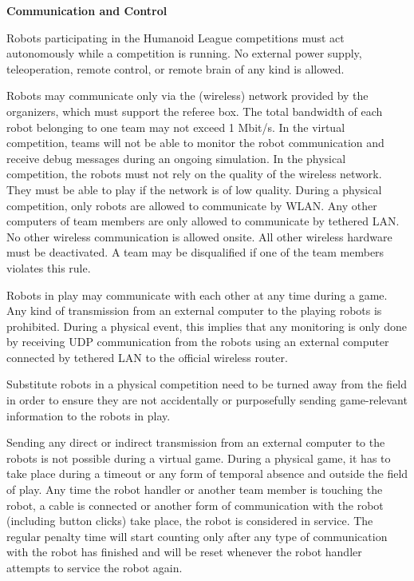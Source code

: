 {\bfseries Communication and Control}

\headlinebox

Robots participating in the Humanoid League competitions must act autonomously while a competition is running. No external power supply, teleoperation, remote control, or remote brain of any kind is allowed.

\bigskip

Robots may communicate only via the (wireless) network provided by the organizers, which must support the referee box. The total bandwidth of each robot belonging to one team may not exceed 1 Mbit/s. In the virtual competition, teams will not be able to monitor the robot communication and receive debug messages during an ongoing simulation. In the physical competition, the robots must not rely on the quality of the wireless network. They
must be able to play if the network is of low quality. During a physical competition, only robots are allowed to communicate by WLAN. Any other computers of team members are only allowed to communicate by tethered LAN. No other wireless communication is allowed onsite. All other wireless hardware must be deactivated. A team may be disqualified if one of the team members violates this rule.

\bigskip

Robots in play may communicate with each other at any time during a game.
Any kind of transmission from an external computer to the playing robots is prohibited. 
During a physical event, this implies that any monitoring is only done by receiving UDP communication
from the robots using an external computer connected by tethered LAN to the
official wireless router.

Substitute robots in a physical competition need to be turned away from the field in order to
ensure they are not accidentally or purposefully sending game-relevant
information to the robots in play.


\bigskip

Sending any direct or indirect transmission from an external computer to the
robots is not possible during a virtual game. During a physical game, it has to take place during a timeout or any form of temporal absence and
outside the field of play.
Any time the robot handler or another team member is touching the robot,
a cable is connected or another form of communication with the robot
(including button clicks) take place, the robot is considered in service.
The regular penalty time will start counting only after any type of
communication with the robot has finished and will be reset whenever the robot
handler attempts to service the robot again.

